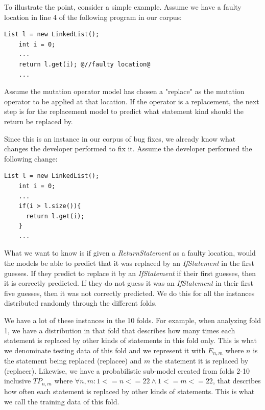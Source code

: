 \documentclass[conference]{IEEEtran}
\begin{document}

To illustrate the point, consider a simple example. Assume we have a 
faulty location in line 4 of the following program in our corpus:

\begin{lstlisting}[frame=single,style=base]
    List l = new LinkedList();
    int i = 0; 
    ...    
    return l.get(i); @//faulty location@
    ...
\end{lstlisting}

Assume the mutation operator model has chosen a "replace" as the mutation operator to be 
applied at that location. If the operator is a replacement, the next step is for the replacement model to predict what statement kind should the return be replaced by.

Since this is an instance in our corpus of bug fixes, we already know what changes the 
developer performed to fix it. Assume the developer performed the following change:

\begin{lstlisting}[frame=single,style=base]
    List l = new LinkedList();
    int i = 0; 
    ...    
    if(i > l.size()){
      return l.get(i);
    }    
    ...
\end{lstlisting}

What we want to know is if given a \emph{ReturnStatement} as a faulty location, 
would the models be able to predict that it was replaced by an \emph{IfStatement} 
in the first guesses. If they predict to replace it by an \emph{IfStatement} if their first 
guesses, then it is correctly predicted. If they do not guess it was an \emph{IfStatement} 
in their first five guesses, then it was not correctly predicted. We do this for all the instances 
distributed randomly through the different folds. 

We have a lot of these instances in the 10 folds. For example, when analyzing fold 1, we 
have a distribution in that fold that describes how many times each statement is replaced 
by other kinds of statements in this fold 
only. This is what we denominate testing data of this fold and we represent it with $E_{n,m}$ 
where $n$ is the statement being replaced (replacee) and $m$ the statement it is 
replaced by (replacer). Likewise, we have a probabilistic sub-model created from 
folds 2-10 inclusive $TP_{n,m}$ where $\forall n,m: 1<=n<=22 \land 1<=m<=22$, 
that describes how often each statement is replaced by 
other kinds of statements. This is what we call the training data of this fold. 
\end{document}
